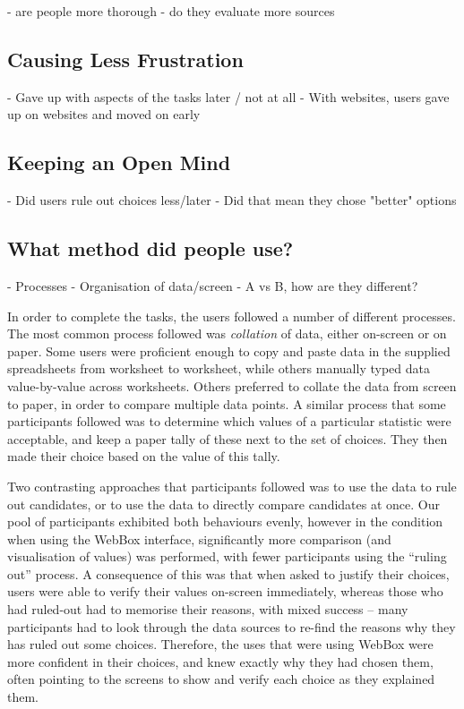 \documentclass{sigchi}
\begin{document}
- are people more thorough
- do they evaluate more sources

\subsection{Causing Less Frustration}

- Gave up with aspects of the tasks later / not at all
- With websites, users gave up on websites and moved on early

\subsection{Keeping an Open Mind}

- Did users rule out choices less/later
- Did that mean they chose "better" options

\subsection{What method did people use?}

- Processes
- Organisation of data/screen
- A vs B, how are they different?



In order to complete the tasks, the users followed a number of different processes. The most common process followed
was {\it collation} of data, either on-screen or on paper. Some users were proficient enough to copy and paste data
in the supplied spreadsheets from worksheet to worksheet, while others manually typed data value-by-value across worksheets.
Others preferred to collate the data from screen to paper, in order to compare multiple data points. A similar process that
some participants followed was to determine which values of a particular statistic were acceptable, and keep a paper tally
of these next to the set of choices. They then made their choice based on the value of this tally.

Two contrasting approaches that participants followed was to use the data to rule out candidates, or to use the data to
directly compare candidates at once. Our pool of participants exhibited both behaviours evenly, however in the condition
when using the WebBox interface, significantly more comparison (and visualisation of values) was performed, with fewer
participants using the ``ruling out'' process. A consequence of this was that when asked to justify their choices, users were
able to verify their values on-screen immediately, whereas those who had ruled-out had to memorise their reasons, with
mixed success  -- many participants had to look through the data sources to re-find the reasons why they has ruled out some choices.
Therefore, the uses that were using WebBox were more confident in their choices, and knew exactly why they had chosen them,
often pointing to the screens to show and verify each choice as they explained them.
\end{document}

